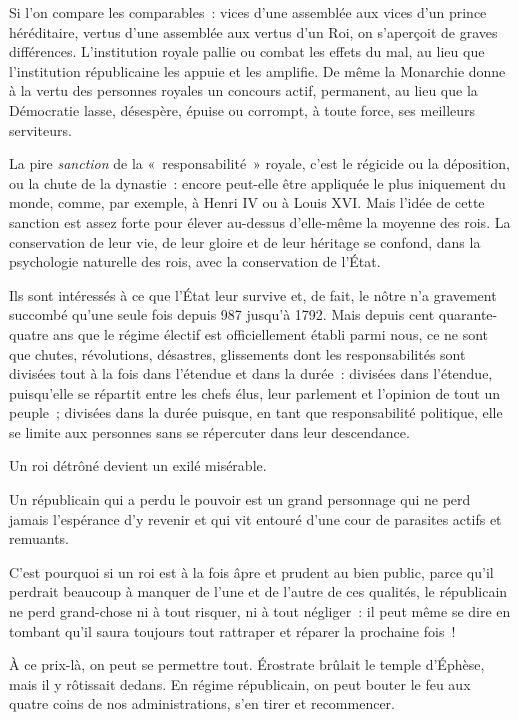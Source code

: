 \documentclass[french,twoside]{book} %
\newcommand{\astermono}{\medskip\centerline{\color{rubric}\large\selectfont{\syms ✻}}\medskip\par}%
\begin{document}
\astermono

\noindent Si l’on compare les comparables : vices d’une assemblée aux vices d’un prince héréditaire, vertus d’une assemblée aux vertus d’un Roi, on s’aperçoit de graves différences. L’institution royale pallie ou combat les effets du mal, au lieu que l’institution républicaine les appuie et les amplifie. De même la Monarchie donne à la vertu des personnes royales un concours actif, permanent, au lieu que la Démocratie lasse, désespère, épuise ou corrompt, à toute force, ses meilleurs serviteurs.\par

\astermono

\noindent La pire \emph{sanction} de la « responsabilité » royale, c’est le régicide ou la déposition, ou la chute de la dynastie : encore peut-elle être appliquée le plus iniquement du monde, comme, par exemple, à Henri IV ou à Louis XVI. Mais l’idée de cette sanction est assez forte pour élever au-dessus d’elle-même la moyenne des rois. La conservation de leur vie, de leur gloire et de leur héritage se confond, dans la psychologie naturelle des rois, avec la conservation de l’État.\par
Ils sont intéressés à ce que l’État leur survive et, de fait, le nôtre n’a gravement succombé qu’une seule fois depuis 987 jusqu’à 1792. Mais depuis cent quarante-quatre ans que le régime électif est officiellement établi parmi nous, ce ne sont que chutes, révolutions, désastres, glissements dont les responsabilités sont divisées tout à la fois dans l’étendue et dans la durée : divisées dans l’étendue, puisqu’elle se répartit entre les chefs élus, leur parlement et l’opinion de tout un peuple ; divisées dans la durée puisque, en tant que responsabilité politique, elle se limite aux personnes sans se répercuter dans leur descendance.\par

\astermono

\noindent Un roi détrôné devient un exilé misérable.\par
Un républicain qui a perdu le pouvoir est un grand personnage qui ne perd jamais l’espérance d’y revenir et qui vit entouré d’une cour de parasites actifs et remuants.\par
C’est pourquoi si un roi est à la fois âpre et prudent au bien public, parce qu’il perdrait beaucoup à manquer de l’une et de l’autre de ces qualités, le républicain ne perd grand-chose ni à tout risquer, ni à tout négliger : il peut même se dire en tombant qu’il saura toujours tout rattraper et réparer la prochaine fois !\par
À ce prix-là, on peut se permettre tout. Érostrate brûlait le temple d’Éphèse, mais il y rôtissait dedans. En régime républicain, on peut bouter le feu aux quatre coins de nos administrations, s’en tirer et recommencer.\par
\end{document}
